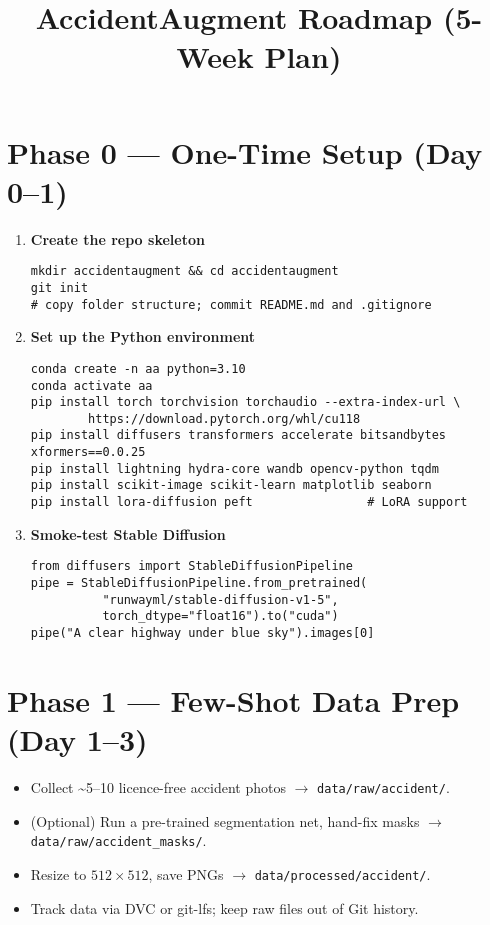 \documentclass[11pt]{article}
\title{AccidentAugment Roadmap (5-Week Plan)}
\date{}           %
\begin{document}
\maketitle

\section*{Phase 0 — One-Time Setup (Day 0–1)}
\begin{enumerate}[leftmargin=*, label=\arabic*.]
  \item \textbf{Create the repo skeleton}
    \begin{verbatim}
mkdir accidentaugment && cd accidentaugment
git init
# copy folder structure; commit README.md and .gitignore
    \end{verbatim}

  \item \textbf{Set up the Python environment}
    \begin{verbatim}
conda create -n aa python=3.10
conda activate aa
pip install torch torchvision torchaudio --extra-index-url \
        https://download.pytorch.org/whl/cu118
pip install diffusers transformers accelerate bitsandbytes xformers==0.0.25
pip install lightning hydra-core wandb opencv-python tqdm
pip install scikit-image scikit-learn matplotlib seaborn
pip install lora-diffusion peft                # LoRA support
    \end{verbatim}

  \item \textbf{Smoke-test Stable Diffusion}
    \begin{verbatim}
from diffusers import StableDiffusionPipeline
pipe = StableDiffusionPipeline.from_pretrained(
          "runwayml/stable-diffusion-v1-5",
          torch_dtype="float16").to("cuda")
pipe("A clear highway under blue sky").images[0]
    \end{verbatim}
\end{enumerate}

\section*{Phase 1 — Few-Shot Data Prep (Day 1–3)}
\begin{itemize}[leftmargin=*]
  \item Collect \textasciitilde5–10 licence-free accident photos $\rightarrow$ \verb|data/raw/accident/|.
  \item (Optional) Run a pre-trained segmentation net, hand-fix masks $\rightarrow$ \verb|data/raw/accident_masks/|.
  \item Resize to $512\times512$, save PNGs $\rightarrow$ \verb|data/processed/accident/|.
  \item Track data via DVC or git-lfs; keep raw files out of Git history.
\end{itemize}
\end{document}
